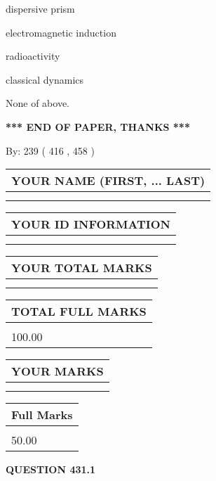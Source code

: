 \documentclass[12pt]{article}
\begin{document}
 
dispersive prism
 
 
electromagnetic induction
 
 
radioactivity
 
 
classical dynamics
 
 
 None of above.
 
 
   
   
\vspace{1.0in} 
{\textbf{\large{ *** END OF PAPER, THANKS *** }}} 
   
   
\hspace{1.0in} By: 
 239 ( 416 ,  458 )
   
   
   
   
\newpage 
\setcounter{page}{ 
   431001 } 
   
   
   
   
\noindent\begin{tabular}{|l|}
\hline
YOUR NAME (FIRST, ... LAST)  \\
\hline
 \\ 
 \\ 
\hline
\end{tabular}
\hspace{0.05in} \begin{tabular}{|l|}
\hline
 YOUR   ID   INFORMATION  \\
\hline
 \\ 
 \\ 
\hline
\end{tabular}
   
   
\vspace{0.2in}\noindent\begin{tabular}{|l|}
\hline
YOUR TOTAL MARKS  \\
\hline
 \\ 
 \\ 
\hline
\end{tabular}
\hspace{0.05in} \begin{tabular}{|l|}
\hline
TOTAL FULL MARKS  \\
\hline
 \\ 
100.00 \\
\hline
\end{tabular}
  
\vspace{0.2in}
  
\noindent\begin{tabular}{|l|}
\hline
 YOUR MARKS  \\
\hline
 \\ 
 \\ 
\hline
\end{tabular}
\hspace{0.05in} \begin{tabular}{|l|}
\hline
 Full Marks  \\
\hline
 \\ 
50.00 \\
\hline
\end{tabular}
{\textbf{\Large{QUESTION
431.1 
}}}
  
\end{document}
